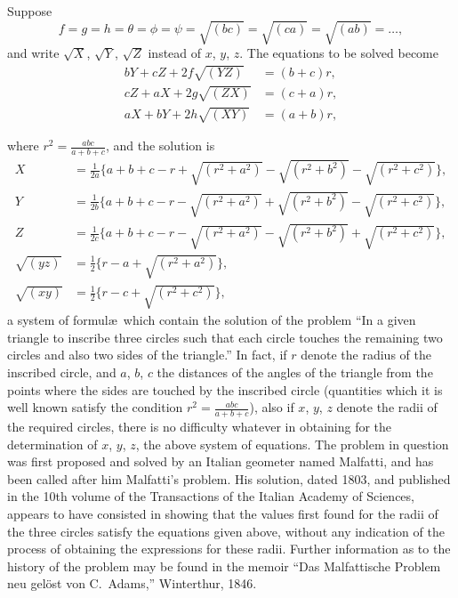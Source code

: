 \documentclass[11pt,a4paper]{book}
\begin{document}
Suppose
\[
f = g = h = \theta = \phi = \psi = \sqrt{(bc)} = \sqrt{(ca)} = \sqrt{(ab)} = \ldots,
\]
and write $\sqrt{X}$, $\sqrt{Y}$, $\sqrt{Z}$ instead of $x$, $y$, $z$. The equations to be solved become
\begin{align*}
bY + cZ + 2f\sqrt{(YZ)} &= (b + c)r, \\
cZ + aX + 2g\sqrt{(ZX)} &= (c + a)r, \\
aX + bY + 2h\sqrt{(XY)} &= (a + b)r,
\end{align*}

\newpage

\setcounter{page}{468}

where $r^{2} = \frac{abc}{a + b + c}$, and the solution is
\begin{align*}
X &= \tfrac{1}{2a}\{a + b + c - r + \sqrt{(r^{2} + a^{2})} - \sqrt{(r^{2} + b^{2})} - \sqrt{(r^{2} + c^{2})}\}, \\
Y &= \tfrac{1}{2b}\{a + b + c - r - \sqrt{(r^{2} + a^{2})} + \sqrt{(r^{2} + b^{2})} - \sqrt{(r^{2} + c^{2})}\}, \\
Z &= \tfrac{1}{2c}\{a + b + c - r - \sqrt{(r^{2} + a^{2})} - \sqrt{(r^{2} + b^{2})} + \sqrt{(r^{2} + c^{2})}\}, \\
\sqrt{(yz)} &= \tfrac{1}{2}\{r - a + \sqrt{(r^{2} + a^{2})}\}, \\
\sqrt{(xy)} &= \tfrac{1}{2}\{r - c + \sqrt{(r^{2} + c^{2})}\},
\end{align*}
a system of formul\ae\ which contain the solution of the problem ``In a given triangle to inscribe three circles such that each circle touches the remaining two circles and also two sides of the triangle.'' In fact, if $r$ denote the radius of the inscribed circle, and $a$, $b$, $c$ the distances of the angles of the triangle from the points where the sides are touched by the inscribed circle (quantities which it is well known satisfy the condition $r^{2} = \frac{abc}{a+b+c}$), also if $x$, $y$, $z$ denote the radii of the required circles, there is no difficulty whatever in obtaining for the determination of $x$, $y$, $z$, the above system of equations. The problem in question was first proposed and solved by an Italian geometer named Malfatti, and has been called after him Malfatti's problem. His solution, dated 1803, and published in the 10th volume of the Transactions of the Italian Academy of Sciences, appears to have consisted in showing that the values first found for the radii of the three circles satisfy the equations given above, without any indication of the process of obtaining the expressions for these radii. Further information as to the history of the problem may be found in the memoir ``Das Malfattische Problem neu gel\"{o}st von C.\ Adams,'' Winterthur, 1846.
\end{document}
